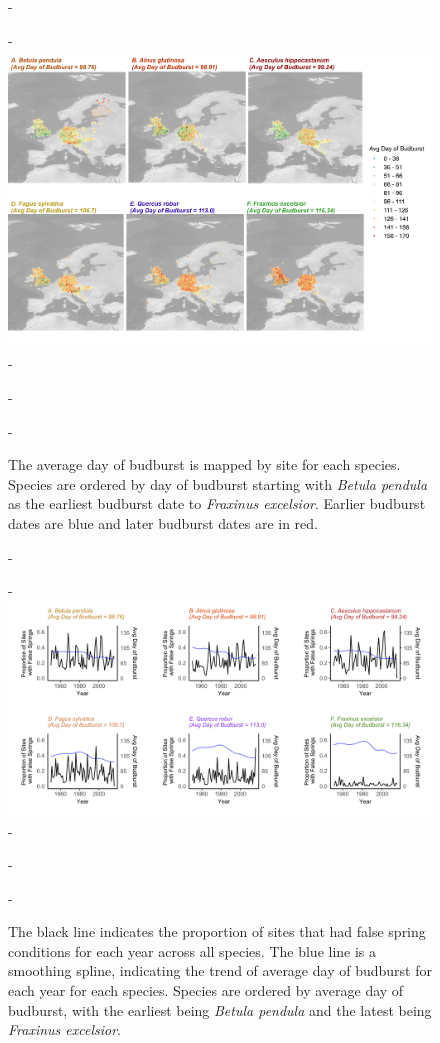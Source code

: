 \documentclass{article}\usepackage[]{graphicx}\usepackage[]{color}
\begin{document}
{\begin{figure} [H]
  -\begin{center}
  -\includegraphics[width=14cm]{..//figures/BB_gis.pdf}
  -\caption{The average day of budburst is mapped by site for each species. Species are ordered by day of budburst starting with \textit{Betula pendula} as the earliest budburst date to \textit{Fraxinus excelsior}. Earlier budburst dates are blue and later budburst dates are in red. }\label{fig:bbmap}
  -\end{center}
  -\end{figure}}
  
{\begin{figure} [H]
  -\begin{center}
  -\includegraphics[width=16cm]{..//figures/PropSitesbyYrwBB.png}
  -\caption{The black line indicates the proportion of sites that had false spring conditions for each year across all species. The blue line is a smoothing spline, indicating the trend of average day of budburst for each year for each species. Species are ordered by average day of budburst, with the earliest being \textit{Betula pendula} and the latest being \textit{Fraxinus excelsior}.}\label{fig:fsprop}
  -\end{center}
  -\end{figure}}
  
\end{document}
